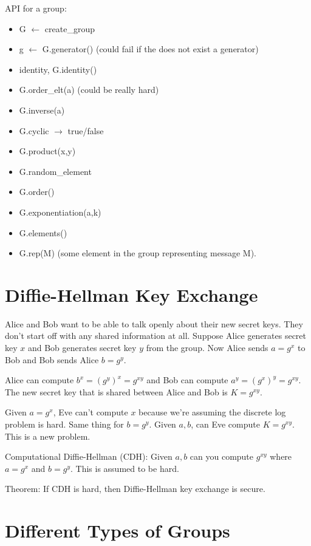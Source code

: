 \documentclass[psamsfonts]{amsart}
\begin{document}
API for a group:
\begin{itemize}
  \item G $\leftarrow$ create\_group
  \item g $\leftarrow$ G.generator() (could fail if the does not exist a generator)
  \item identity, G.identity()
  \item G.order\_elt(a) (could be really hard)
  \item G.inverse(a)
  \item G.cyclic $\rightarrow$ true/false
  \item G.product(x,y)
  \item G.random\_element
  \item G.order()
  \item G.exponentiation(a,k)
  \item G.elements()
  \item G.rep(M) (some element in the group representing message M).
\end{itemize}

\section{Diffie-Hellman Key Exchange}

Alice and Bob want to be able to talk openly about their new secret keys. They don't start off with any shared information at all. Suppose Alice generates secret key $x$ and Bob generates secret key $y$ from the group. Now Alice sends $a = g^x$ to Bob and Bob sends Alice $b = g^y$.

Alice can compute $b^x = (g^y)^x = g^{xy}$ and Bob can compute $a^y = (g^x)^y = g^{xy}$. The new secret key that is shared between Alice and Bob is $K = g^{xy}$.

Given  $a = g^x$, Eve can't compute $x$ because we're assuming the discrete log problem is hard. Same thing for $b = g^y$. Given $a,b$, can Eve compute $K = g^{xy}$. This is a new problem.

Computational Diffie-Hellman (CDH): Given $a,b$ can you compute $g^{xy}$ where $a = g^{x}$ and $b = g^{y}$. This is assumed to be hard.

Theorem: If CDH is hard, then Diffie-Hellman key exchange is secure.

\section{Different Types of Groups}
\end{document}
